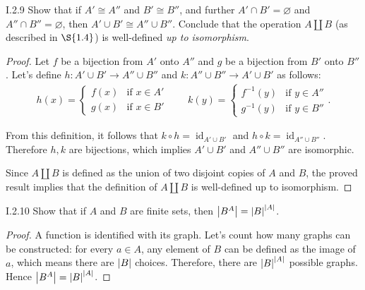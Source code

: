 \begin{exercise}{I.2.9}\label{exercise:I.2.9}
	Show that if $A'\cong A''$ and $B'\cong B''$, and further $A'\cap B' = \varnothing$ and $A''\cap B'' = \varnothing$, then $A'\cup B' \cong A''\cup B''$. Conclude that the operation $A\coprod B$ (as described in $\S{1.4}$) is well-defined \textit{up to isomorphism}.
\end{exercise}

\begin{proof}
	Let $f$ be a bijection from $A'$ onto $A''$ and $g$ be a bijection from $B'$ onto $B''$. Let's define $h: A'\cup B' \to A''\cup B''$ and $k: A''\cup B''\to A'\cup B'$ as follows:
	\begin{align*}
		h(x) = \begin{cases}
			       f(x) & \text{if $x\in A'$} \\
			       g(x) & \text{if $x\in B'$}
		       \end{cases}
		\qquad
		k(y) = \begin{cases}
			       f^{-1}(y) & \text{if $y\in A''$} \\
			       g^{-1}(y) & \text{if $y\in B''$}
		       \end{cases}.
	\end{align*}

	From this definition, it follows that $k\circ h = \operatorname{id}_{A'\cup B'}$ and $h\circ k = \operatorname{id}_{A''\cup B''}$. Therefore $h, k$ are bijections, which implies $A'\cup B'$ and $A''\cup B''$ are isomorphic.

	Since $A\coprod B$ is defined as the union of two disjoint copies of $A$ and $B$, the proved result implies that the definition of $A\coprod B$ is well-defined up to isomorphism.
\end{proof}

\begin{exercise}{I.2.10}\label{exercise:I.2.10}
	Show that if $A$ and $B$ are finite sets, then $\left\vert{B^{A}}\right\vert = {\left\vert{B}\right\vert}^{\left\vert{A}\right\vert}$.
\end{exercise}

\begin{proof}
	A function is identified with its graph. Let's count how many graphs can be constructed: for every $a\in A$, any element of $B$ can be defined as the image of $a$, which means there are $\left\vert{B}\right\vert$ choices. Therefore, there are ${\left\vert{B}\right\vert}^{\left\vert{A}\right\vert}$ possible graphs. Hence $\left\vert{B^{A}}\right\vert = {\left\vert{B}\right\vert}^{\left\vert{A}\right\vert}$.
\end{proof}

